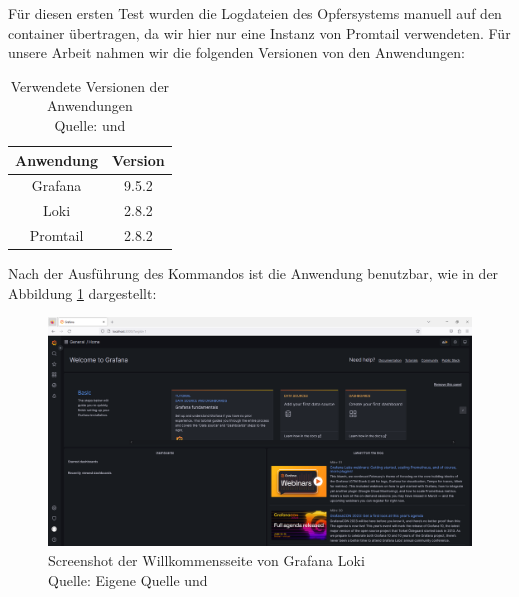 Für diesen ersten Test wurden die Logdateien des Opfersystems manuell auf den \gls{container} übertragen, da wir hier nur eine Instanz von Promtail verwendeten. Für unsere Arbeit nahmen wir die folgenden Versionen von den Anwendungen:
\begin{table}[h]
   \centering
   \begin{tabular}{|c|c|}
   \hline
   \textbf{Anwendung}  & \textbf{Version}    \\ \hline
   Grafana             & 9.5.2          \\ \hline
   Loki                & 2.8.2             \\ \hline
   Promtail            & 2.8.2          \\ \hline
   \end{tabular}
   \caption[Verwendete Versionen der Anwendungen]
   {Verwendete Versionen der Anwendungen \\Quelle: \citep{Grafana_Version} und \citep{GrafanaLoki_Version}}
   \label{tab:Versions}
\end{table}


\newpage
{} 
\thispagestyle{lscape}
\begin{landscape}
   Nach der Ausführung des Kommandos ist die Anwendung benutzbar, wie in der Abbildung \ref{fig:grafana_welcome} dargestellt:
    \begin{figure}[H]
        \centerline{\includegraphics[width=1.5\textwidth]{assets/Installation_Grafana.png}}
        \caption[Screenshot der Willkommensseite von Grafana Loki]
        {Screenshot der Willkommensseite von Grafana Loki\\Quelle: Eigene Quelle und \citep{Grafana_Logs}}
        \label{fig:grafana_welcome}
        \centering
    \end{figure} 
\end{landscape}
\restoregeometry  

